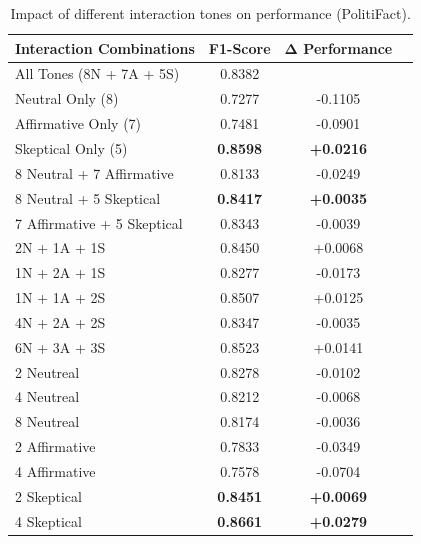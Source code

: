 \begin{table}[htbp]
\centering
\caption{Impact of different interaction tones on performance (PolitiFact).}
\label{tab:ablation_tones_politifact}
\begin{tabular}{lccc}
\toprule
\textbf{Interaction Combinations} & \textbf{F1-Score} & \textbf{Δ Performance} \\
\midrule
All Tones (8N + 7A + 5S) & 0.8382 & \- \\
\midrule
Neutral Only (8) & 0.7277 & -0.1105 \\
Affirmative Only (7) & 0.7481 & -0.0901 \\
Skeptical Only (5) & \textbf{0.8598} & \textbf{+0.0216} \\
\midrule
8 Neutral + 7 Affirmative & 0.8133 & -0.0249 \\
8 Neutral + 5 Skeptical & \textbf{0.8417} & \textbf{+0.0035} \\
7 Affirmative + 5 Skeptical & 0.8343 & -0.0039 \\
\midrule
2N + 1A + 1S & 0.8450 & +0.0068 \\
1N + 2A + 1S & 0.8277 & -0.0173 \\
1N + 1A + 2S & 0.8507 & +0.0125 \\
\midrule
4N + 2A + 2S & 0.8347 & -0.0035 \\
6N + 3A + 3S & 0.8523 & +0.0141 \\
\midrule
2 Neutreal & 0.8278 & -0.0102 \\
4 Neutreal & 0.8212 & -0.0068 \\
8 Neutreal & 0.8174 & -0.0036 \\ 
2 Affirmative & 0.7833 & -0.0349 \\
4 Affirmative & 0.7578 & -0.0704 \\
2 Skeptical & \textbf{0.8451} & \textbf{+0.0069} \\
4 Skeptical & \textbf{0.8661} & \textbf{+0.0279} \\
\bottomrule
\end{tabular}
\end{table}

